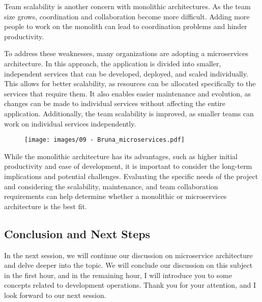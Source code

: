 Team scalability is another concern with monolithic architectures. As
the team size grows, coordination and collaboration become more
difficult. Adding more people to work on the monolith can lead to
coordination problems and hinder productivity.

To address these weaknesses, many organizations are adopting a
microservices architecture. In this approach, the application is divided
into smaller, independent services that can be developed, deployed, and
scaled individually. This allows for better scalability, as resources
can be allocated specifically to the services that require them. It also
enables easier maintenance and evolution, as changes can be made to
individual services without affecting the entire application.
Additionally, the team scalability is improved, as smaller teams can
work on individual services independently.

\begin{figure}[!h]
  \centering
  \texttt{[image: images/09 - Bruna\_microservices.pdf]}
\end{figure}

While the monolithic architecture has its advantages, such as higher
initial productivity and ease of development, it is important to
consider the long-term implications and potential challenges. Evaluating
the specific needs of the project and considering the scalability,
maintenance, and team collaboration requirements can help determine
whether a monolithic or microservices architecture is the best fit.

\subsection{Conclusion and Next Steps}

In the next session, we will continue our discussion on microservice
architecture and delve deeper into the topic. We will conclude our
discussion on this subject in the first hour, and in the remaining hour,
I will introduce you to some concepts related to development operations.
Thank you for your attention, and I look forward to our next session.
